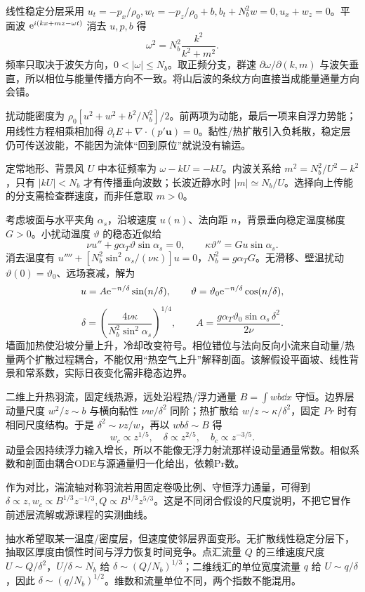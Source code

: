 线性稳定分层采用 $u_t=-p_x/\rho_0,w_t=-p_z/\rho_0+b,b_t+N_b^2w=0,u_x+w_z=0$。平面波 $\mathrm e^{i(kx+mz-\omega t)}$ 消去 $u,p,b$ 得
\[
\omega^2=N_b^2\frac{k^2}{k^2+m^2}.
\]
频率只取决于波矢方向，$0<|\omega|\le N_b$。取正频分支，群速 $\partial\omega/\partial(k,m)$ 与波矢垂直，所以相位与能量传播方向不一致。将山后波的条纹方向直接当成能量通量方向会错。

扰动能密度为 $\rho_0[u^2+w^2+b^2/N_b^2]/2$。前两项为动能，最后一项来自浮力势能；用线性方程相乘相加得 $\partial_t E+\nabla\cdot(p'\mathbf u)=0$。黏性/热扩散引入负耗散，稳定层仍可传送波能，不能因为流体“回到原位”就说没有输运。

定常地形、背景风 $U$ 中本征频率为 $\omega-kU=-kU$。内波关系给 $m^2=N_b^2/U^2-k^2$，只有 $|kU|<N_b$ 才有传播垂向波数；长波近静水时 $|m|\simeq N_b/U$。选择向上传能的分支需检查群速度，而非任意取 $m>0$。

考虑坡面与水平夹角 $\alpha_s$，沿坡速度 $u(n)$、法向距 $n$，背景垂向稳定温度梯度 $G>0$。小扰动温度 $\vartheta$ 的稳态近似给
\[
\nu u''+g\alpha_T\vartheta\sin\alpha_s=0,\qquad
\kappa\vartheta''=G u\sin\alpha_s.
\]
消去温度有 $u''''+[N_b^2\sin^2\alpha_s/(\nu\kappa)]u=0$，$N_b^2=g\alpha_TG$。无滑移、壁温扰动 $\vartheta(0)=\vartheta_0$、远场衰减，解为
\[
u=A\mathrm e^{-n/\delta}\sin(n/\delta),\qquad
\vartheta=\vartheta_0\mathrm e^{-n/\delta}\cos(n/\delta),
\]
\[
\delta=\left(\frac{4\nu\kappa}{N_b^2\sin^2\alpha_s}\right)^{1/4},\qquad
A=\frac{g\alpha_T\vartheta_0\sin\alpha_s\,\delta^2}{2\nu}.
\]
墙面加热使沿坡分量上升，冷却改变符号。相位错位与法向反向小流来自动量/热量两个扩散过程耦合，不能仅用“热空气上升”解释剖面。该解假设平面坡、线性背景和常系数，实际日夜变化需非稳态边界。

二维上升热羽流，固定线热源，远处沿程热/浮力通量 $B=\int wb\dd x$ 守恒。边界层动量尺度 $w^2/z\sim b$ 与横向黏性 $\nu w/\delta^2$ 同阶；热扩散给 $w/z\sim\kappa/\delta^2$，固定 $Pr$ 时有相同尺度结构。于是 $\delta^2\sim\nu z/w$，再以 $w b\delta\sim B$ 得
\[
w_c\propto z^{1/5},\quad\delta\propto z^{2/5},\quad b_c\propto z^{-3/5}.
\]
动量会因持续浮力输入增长，所以不能像无浮力射流那样设动量通量常数。相似系数和剖面由耦合ODE与源通量归一化给出，依赖Pr数。

作为对比，湍流轴对称羽流若用固定卷吸比例、守恒浮力通量，可得到 $\delta\propto z,w_c\propto B^{1/3}z^{-1/3},Q\propto B^{1/3}z^{5/3}$。这是不同闭合假设的尺度说明，不把它冒作前述层流解或源课程的实测曲线。

抽水希望取某一温度/密度层，但速度使邻层界面变形。无扩散线性稳定分层下，抽取区厚度由惯性时间与浮力恢复时间竞争。点汇流量 $Q$ 的三维速度尺度 $U\sim Q/\delta^2$，$U/\delta\sim N_b$ 给 $\delta\sim(Q/N_b)^{1/3}$；二维线汇的单位宽度流量 $q$ 给 $U\sim q/\delta$，因此 $\delta\sim(q/N_b)^{1/2}$。维数和流量单位不同，两个指数不能混用。

